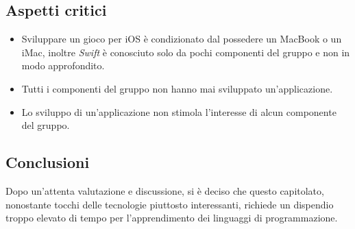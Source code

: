  \subsection{Aspetti critici}
\begin{itemize}
	\item Sviluppare un gioco per iOS è condizionato dal possedere un MacBook o un iMac, inoltre \textit{Swift} è conosciuto solo da pochi componenti del gruppo e non in modo approfondito.
	\item Tutti i componenti del gruppo non hanno mai sviluppato un'applicazione.
	\item Lo sviluppo di un'applicazione non stimola l'interesse di alcun componente del gruppo.
\end{itemize}

\subsection{Conclusioni}
Dopo un'attenta valutazione e discussione, si è deciso che questo capitolato, nonostante tocchi delle tecnologie piuttosto interessanti, richiede un dispendio troppo elevato di tempo per l'apprendimento dei linguaggi di programmazione.
